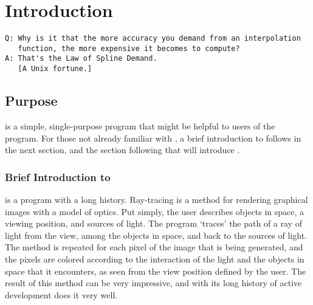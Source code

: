 \chapter{Introduction}
\ifMKwx
	\small
\begin{verbatim}
Q: Why is it that the more accuracy you demand from an interpolation
   function, the more expensive it becomes to compute?
A: That's the Law of Spline Demand.
   [A Unix fortune.]
\end{verbatim}
	\normalsize
\else
\fi %

\section{Purpose}%
\IXpkgu{} is a simple, single-purpose program that might
be helpful to users of the \IXpov{} program.
For those not already familiar with \IXpov{},
a brief introduction to \IXpov{} follows in the next section,
and the section following that will introduce \IXpkg.

	\subsection{Brief Introduction to \dtypov}
\IXpov{} is a  program with a long history.
Ray-tracing is a method for rendering
graphical images with a model of optics.
Put simply, the user describes objects in space, a viewing position,
and sources of light. The program `traces' the path of a ray of
light from the view, among the objects in space, and back to the sources
of light. The method is repeated for each pixel of the image that
is being generated, and the pixels are colored according to the
interaction of the light and the objects in space that it encounters,
as seen from the view position defined by the user.
The result of this method can be very impressive, and with its
long history of active development \IXpov{} does it very well.

